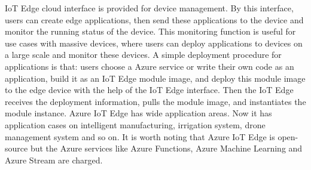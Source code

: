 IoT Edge cloud interface is provided for device management. By this interface, users can create edge applications, then send these applications to the device and monitor the running status of the device. This monitoring function is useful for use cases with massive devices, where users can deploy applications to devices on a large scale and monitor these devices.
A simple deployment procedure for applications is that: users choose a Azure service or write their own code as an application, build it as an IoT Edge module image, and deploy this module image to the edge device with the help of the IoT Edge interface. Then the IoT Edge receives the deployment information, pulls the module image, and instantiates the module instance.
Azure IoT Edge has wide application areas. Now it has application cases on intelligent manufacturing, irrigation system, drone management system and so on. It is worth noting that Azure IoT Edge is open-source but the Azure services like Azure Functions, Azure Machine Learning and Azure Stream are charged.

